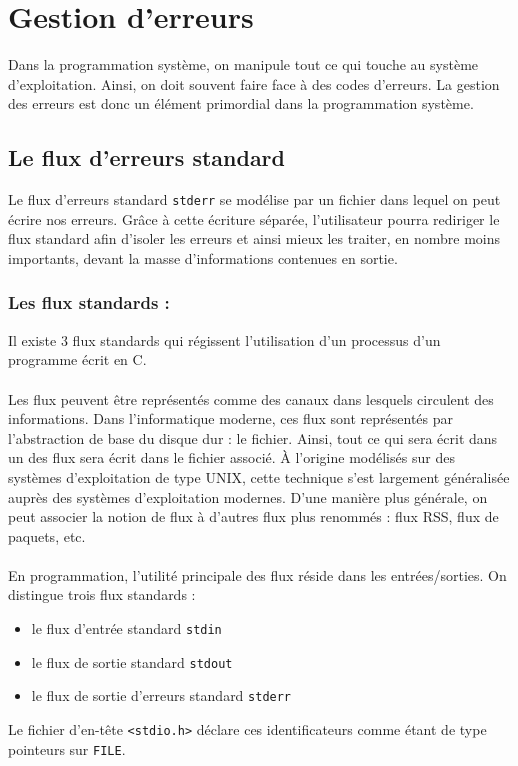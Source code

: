 \section{Gestion d'erreurs}

	Dans la programmation système, on manipule tout ce qui touche au système d'exploitation. Ainsi, on doit souvent faire face à des codes d'erreurs. La gestion des erreurs est donc un élément primordial dans la programmation système.
	
	\subsection{Le flux d'erreurs standard}
		Le flux d'erreurs standard \lstinline!stderr! se modélise par un fichier dans lequel on peut écrire nos erreurs. Grâce à cette écriture séparée, l'utilisateur pourra rediriger le flux standard afin d'isoler les erreurs et ainsi mieux les traiter, en nombre moins importants, devant la masse d'informations contenues en sortie. 
		
		\subsubsection*{Les flux standards :}
			Il existe 3 flux standards qui régissent l'utilisation d'un processus d'un programme écrit en C.
			
			\paragraph{} Les flux peuvent être représentés comme des canaux dans lesquels circulent des informations. Dans l'informatique moderne, ces flux sont représentés par l'abstraction de base du disque dur : le fichier. Ainsi, tout ce qui sera écrit dans un des flux sera écrit dans le fichier associé. À l'origine modélisés sur des systèmes d'exploitation de type UNIX, cette technique s'est largement généralisée auprès des systèmes d'exploitation modernes. D'une manière plus générale, on peut associer la notion de flux à d'autres flux plus renommés : flux RSS, flux de paquets, etc.
			
			\paragraph{} En programmation, l'utilité principale des flux réside dans les entrées/sorties. On distingue trois flux standards : 
			\begin{itemize}
				\item le flux d'entrée standard \lstinline!stdin!
				\item le flux de sortie standard \lstinline!stdout!
				\item le flux de sortie d'erreurs standard \lstinline!stderr!
			\end{itemize}
			Le fichier d'en-tête \lstinline!<stdio.h>! déclare ces identificateurs comme étant de type pointeurs sur \lstinline!FILE!.
			
